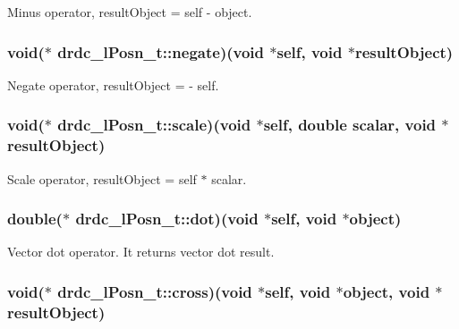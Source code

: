 Minus operator, resultObject = self - object. 

\hypertarget{structdrdc__lPosn__t_f448fb95bac4105a59f47d805426a184}{
\subsubsection[negate]{\setlength{\rightskip}{0pt plus 5cm}void($\ast$ {\bf drdc\_\-lPosn\_\-t::negate})(void $\ast$self, void $\ast$resultObject)}}
\label{structdrdc__lPosn__t_f448fb95bac4105a59f47d805426a184}


Negate operator, resultObject = - self. 

\hypertarget{structdrdc__lPosn__t_b841f4ece0abc002c4a20591bd18a25b}{
\subsubsection[scale]{\setlength{\rightskip}{0pt plus 5cm}void($\ast$ {\bf drdc\_\-lPosn\_\-t::scale})(void $\ast$self, double scalar, void $\ast$resultObject)}}
\label{structdrdc__lPosn__t_b841f4ece0abc002c4a20591bd18a25b}


Scale operator, resultObject = self $\ast$ scalar. 

\hypertarget{structdrdc__lPosn__t_29d500e7d47448506ca584e046a265bf}{
\subsubsection[dot]{\setlength{\rightskip}{0pt plus 5cm}double($\ast$ {\bf drdc\_\-lPosn\_\-t::dot})(void $\ast$self, void $\ast$object)}}
\label{structdrdc__lPosn__t_29d500e7d47448506ca584e046a265bf}


Vector dot operator. It returns vector dot result. 

\hypertarget{structdrdc__lPosn__t_a598f7e243438190e4812ffa9cef2d97}{
\subsubsection[cross]{\setlength{\rightskip}{0pt plus 5cm}void($\ast$ {\bf drdc\_\-lPosn\_\-t::cross})(void $\ast$self, void $\ast$object, void $\ast$resultObject)}}
\label{structdrdc__lPosn__t_a598f7e243438190e4812ffa9cef2d97}


